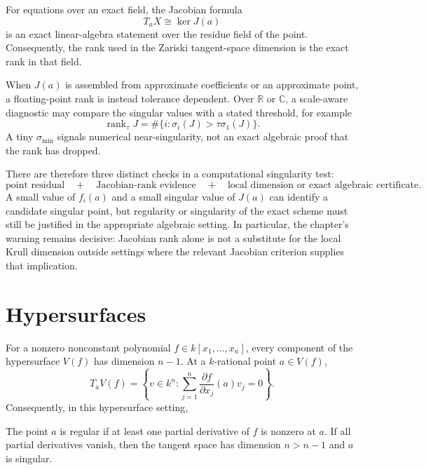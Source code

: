 \begin{remark}
For equations over an exact field, the Jacobian formula
\[
T_aX\cong\ker J(a)
\]
is an exact linear-algebra statement over the residue field of the point.
Consequently, the rank used in the Zariski tangent-space dimension is the exact
rank in that field.

When \(J(a)\) is assembled from approximate coefficients or an approximate
point, a floating-point rank is instead tolerance dependent. Over
\(\mathbb R\) or \(\mathbb C\), a scale-aware diagnostic may compare the
singular values with a stated threshold, for example
\[
\operatorname{rank}_{\tau}J
=
\#\{i:\sigma_i(J)>\tau\sigma_1(J)\}.
\]
A tiny \(\sigma_{\min}\) signals numerical near-singularity, not an exact
algebraic proof that the rank has dropped.

There are therefore three distinct checks in a computational singularity test:
\[
\text{point residual}
\quad+\quad
\text{Jacobian-rank evidence}
\quad+\quad
\text{local dimension or exact algebraic certificate}.
\]
A small value of \(f_i(a)\) and a small singular value of \(J(a)\) can identify
a candidate singular point, but regularity or singularity of the exact scheme
must still be justified in the appropriate algebraic setting. In particular,
the chapter's warning remains decisive: Jacobian rank alone is not a substitute
for the local Krull dimension outside settings where the relevant Jacobian
criterion supplies that implication.
\end{remark}

\section{Hypersurfaces}\label{sec:vi32-hypersurface}
For a nonzero nonconstant polynomial $f\in k[x_1,\ldots,x_n]$, every component of the hypersurface $V(f)$ has dimension
$n-1$. At a $k$-rational point $a\in V(f)$,
\[
 T_aV(f)=\left\{v\in k^n:\sum_{j=1}^n\frac{\partial f}{\partial x_j}(a)v_j=0\right\}.
\]
Consequently, in this hypersurface setting,
\begin{corollary}\label{cor:vi32-hypersurface}
The point $a$ is regular if at least one partial derivative of $f$ is nonzero at $a$.  If all partial derivatives vanish,
then the tangent space has dimension $n>n-1$ and $a$ is singular.
\end{corollary}


